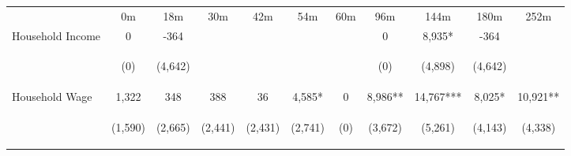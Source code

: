 \begin{tabular}{lcccccccccc}
\hline \noalign{\smallskip} & 0m & 18m & 30m & 42m & 54m & 60m & 96m & 144m & 180m & 252m\\
\noalign{\smallskip}\hline \noalign{\smallskip}Household Income & 0 & -364 &  &  &  &  & 0 & 8,935* & -364 & \\
 & \begin{footnotesize}(0)\end{footnotesize} & \begin{footnotesize}(4,642)\end{footnotesize} & \begin{footnotesize}\end{footnotesize} & \begin{footnotesize}\end{footnotesize} & \begin{footnotesize}\end{footnotesize} & \begin{footnotesize}\end{footnotesize} & \begin{footnotesize}(0)\end{footnotesize} & \begin{footnotesize}(4,898)\end{footnotesize} & \begin{footnotesize}(4,642)\end{footnotesize} & \begin{footnotesize}\end{footnotesize}\\
\noalign{\smallskip}Household Wage & 1,322 & 348 & 388 & 36 & 4,585* & 0 & 8,986** & 14,767*** & 8,025* & 10,921**\\
 & \begin{footnotesize}(1,590)\end{footnotesize} & \begin{footnotesize}(2,665)\end{footnotesize} & \begin{footnotesize}(2,441)\end{footnotesize} & \begin{footnotesize}(2,431)\end{footnotesize} & \begin{footnotesize}(2,741)\end{footnotesize} & \begin{footnotesize}(0)\end{footnotesize} & \begin{footnotesize}(3,672)\end{footnotesize} & \begin{footnotesize}(5,261)\end{footnotesize} & \begin{footnotesize}(4,143)\end{footnotesize} & \begin{footnotesize}(4,338)\end{footnotesize}\\

\end{tabular}
